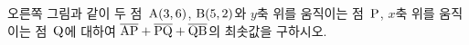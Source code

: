 \noindent\begin{minipage}[t]{0.58\linewidth}\vspace{0pt}\raggedright 오른쪽 그림과 같이 두 점~$\mathrm{A}(3{,}\mkern3mu\mathopen{}6)$, $\mathrm{B}(5{,}\mkern3mu\mathopen{}2)$와 $y$축 위를 움직이는 점~$\mathrm{P}$, $x$축 위를 움직이는 점~$\mathrm{Q}$에 대하여 $\overline{\mathrm{AP}}+\overline{\mathrm{PQ}}+\overline{\mathrm{QB}}$의 최솟값을 구하시오.\end{minipage}\hfill\begin{minipage}[t]{0.4\linewidth}\vspace{0pt}\centering \resizebox{\ifdim\width>\linewidth\linewidth\else\width\fi}{!}{}\end{minipage}\par
